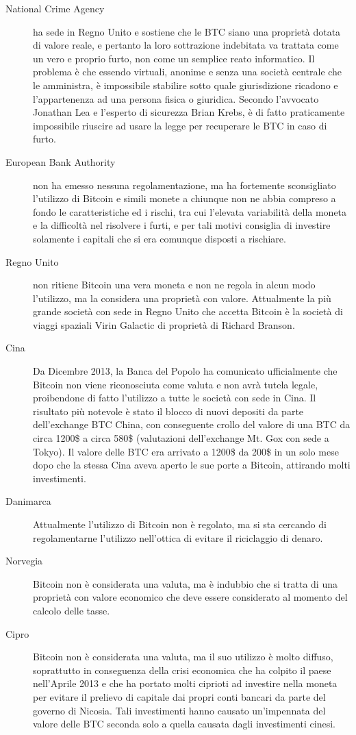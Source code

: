 \begin{description}
 \item[National Crime Agency] ha sede in Regno Unito e sostiene che le BTC siano una proprietà dotata di valore reale, e pertanto la loro sottrazione indebitata va trattata come un vero e proprio furto, non come un semplice reato informatico. Il problema è che essendo virtuali, anonime e senza una società centrale che le amministra, è impossibile stabilire sotto quale giurisdizione ricadono e l'appartenenza ad una persona fisica o giuridica. Secondo l'avvocato Jonathan Lea e l'esperto di sicurezza Brian Krebs, è di fatto praticamente impossibile riuscire ad usare la legge per recuperare le BTC in caso di furto.
 \item[European Bank Authority] non ha emesso nessuna regolamentazione, ma ha fortemente sconsigliato l'utilizzo di Bitcoin e simili monete a chiunque non ne abbia compreso a fondo le caratteristiche ed i rischi, tra cui l'elevata variabilità della moneta e la difficoltà nel risolvere i furti, e per tali motivi consiglia di investire solamente i capitali che si era comunque disposti a rischiare.
 \item[Regno Unito] non ritiene Bitcoin una vera moneta e non ne regola in alcun modo l'utilizzo, ma la considera una proprietà con valore. Attualmente la più grande società con sede in Regno Unito che accetta Bitcoin è la società di viaggi spaziali Virin Galactic di proprietà di Richard Branson.
 \item[Cina] Da Dicembre 2013, la Banca del Popolo ha comunicato ufficialmente che Bitcoin non viene riconosciuta come valuta e non avrà tutela legale, proibendone di fatto l'utilizzo a tutte le società con sede in Cina. Il risultato più notevole è stato il blocco di nuovi depositi da parte dell'exchange BTC China, con conseguente crollo del valore di una BTC da circa 1200\$ a circa 580\$ (valutazioni dell'exchange Mt. Gox con sede a Tokyo). Il valore delle BTC era arrivato a 1200\$ da 200\$ in un solo mese dopo che la stessa Cina aveva aperto le sue porte a Bitcoin, attirando molti investimenti.
 \item[Danimarca] Attualmente l'utilizzo di Bitcoin non è regolato, ma si sta cercando di regolamentarne l'utilizzo nell'ottica di evitare il riciclaggio di denaro.
 \item[Norvegia] Bitcoin non è considerata una valuta, ma è indubbio che si tratta di una proprietà con valore economico che deve essere considerato al momento del calcolo delle tasse.
 \item[Cipro] Bitcoin non è considerata una valuta, ma il suo utilizzo è molto diffuso, soprattutto in conseguenza della crisi economica che ha colpito il paese nell'Aprile 2013 e che ha portato molti ciprioti ad investire nella moneta per evitare il prelievo di capitale dai propri conti bancari da parte del governo di Nicosia. Tali investimenti hanno causato un'impennata del valore delle BTC seconda solo a quella causata dagli investimenti cinesi.\\

\end{description}
